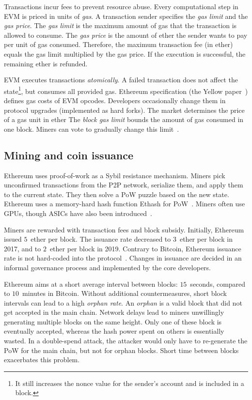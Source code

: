 Transactions incur fees to prevent resource abuse.
Every computational step in EVM is priced in units of \emph{gas}.
A transaction sender specifies the \textit{gas limit} and the \textit{gas price}.
The \textit{gas limit} is the maximum amount of gas that the transaction is allowed to consume.
The \textit{gas price} is the amount of ether the sender wants to pay per unit of gas consumed.
Therefore, the maximum transaction fee (in ether) equals the gas limit multiplied by the gas price.
If the execution is successful, the remaining ether is refunded.

EVM executes transactions \textit{atomically}.
A failed transaction does not affect the state\footnote{It still increases the nonce value for the sender's account and is included in a block.}, but consumes all provided gas.
Ethereum specification (the Yellow paper~\cite{Wood2014}) defines gas costs of EVM opcodes.
Developers occasionally change them in protocol upgrades (implemented as hard forks).
The market determines the price of a gas unit in ether
The \textit{block gas limit} bounds the amount of gas consumed in one block.
Miners can vote to gradually change this limit~\cite{Jnnk15}.


\subsection{Mining and coin issuance}

Ethereum uses proof-of-work as a Sybil resistance mechanism.
Miners pick unconfirmed transactions from the P2P network, serialize them, and apply them to the current state.
They then solve a PoW puzzle based on the new state.
Ethereum uses a memory-hard hash function Ethash for PoW~\cite{Ethash}.
Miners often use GPUs, though ASICs have also been introduced~\cite{OLeary2018}.

Miners are rewarded with transaction fees and block subsidy.
Initially, Ethereum issued $5$~ether per block.
The issuance rate decreased to $3$~ether per block in 2017, and to $2$~ether per block in 2019.
Contrary to Bitcoin, Ethereum issuance rate is not hard-coded into the protocol~\cite{Ethhub2020}.
Changes in issuance are decided in an informal governance process and implemented by the core developers.

Ethereum aims at a short average interval between blocks: $15$~seconds, compared to $10$~minutes in Bitcoin.
Without additional countermeasures, short block intervals can lead to a high \textit{orphan rate}.
An \textit{orphan} is a valid block that did not get accepted in the main chain.
Network delays lead to miners unwillingly generating multiple blocks on the same height.
Only one of these block is eventually accepted, whereas the hash power spent on others is essentially wasted.
In a double-spend attack, the attacker would only have to re-generate the PoW for the main chain, but not for orphan blocks.
Short time between blocks exacerbates this problem.

